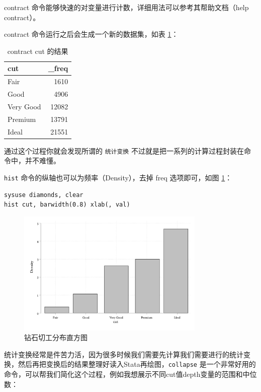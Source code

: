 \documentclass[]{ctexbook}
\begin{document}
contract 命令能够快速的对变量进行计数，详细用法可以参考其帮助文档（help contract）。

contract 命令运行之后会生成一个新的数据集，如表 \ref{tab:cut}：

\begin{table}[t]

\caption{\label{tab:cut}contract cut 的结果}
\centering
\begin{tabular}{lr}
\toprule
cut & \_freq\\
\midrule
Fair & 1610\\
Good & 4906\\
Very Good & 12082\\
Premium & 13791\\
Ideal & 21551\\
\bottomrule
\end{tabular}
\end{table}

通过这个过程你就会发现所谓的 \texttt{统计变换} 不过就是把一系列的计算过程封装在命令中，并不难懂。

\texttt{hist} 命令的纵轴也可以为频率（Density），去掉 freq 选项即可，如图 \ref{fig:histcut2}：

\begin{lstlisting}
sysuse diamonds, clear
hist cut, barwidth(0.8) xlab(, val)
\end{lstlisting}

\begin{figure}

{\centering \includegraphics[width=0.8\textwidth]{assets/histcut2} 

}

\caption{钻石切工分布直方图}\label{fig:histcut2}
\end{figure}

统计变换经常是件苦力活，因为很多时候我们需要先计算我们需要进行的统计变换，然后再把变换后的结果整理好读入Stata再绘图，\texttt{collapse} 是一个非常好用的命令，可以帮我们简化这个过程，例如我想展示不同cut值depth变量的范围和中位数：
\end{document}
